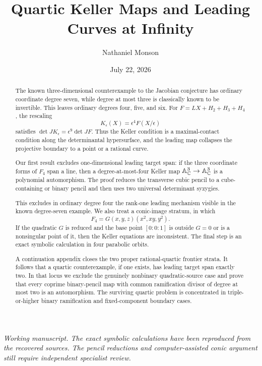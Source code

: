 \documentclass[11pt,reqno]{amsart}
\title[Quartic Keller maps and leading curves]{Quartic Keller Maps and
Leading Curves at Infinity}
\author{Nathaniel Monson}
\date{July 22, 2026}
\begin{document}
\begin{abstract}
The known three-dimensional counterexample to the Jacobian conjecture has
ordinary coordinate degree seven, while degree at most three is classically
known to be invertible.  This leaves ordinary degrees four, five, and six.
For \(F=LX+H_2+H_3+H_4\), the rescaling
\[
K_\epsilon(X)=\epsilon^4F(X/\epsilon)
\]
satisfies \(\det JK_\epsilon=\epsilon^9\det JF\).  Thus the Keller
condition is a maximal-contact condition along the determinantal
hypersurface, and the leading map collapses the projective boundary to a
point or a rational curve.

Our first result excludes one-dimensional leading target span: if the three
coordinate forms of \(F_4\) span a line, then a degree-at-most-four Keller map
\(\mathbb A^3_{\mathbb C}\to\mathbb A^3_{\mathbb C}\) is a polynomial automorphism.  The proof reduces
the transverse cubic pencil to a cube-containing or binary pencil and then
uses two universal determinant syzygies.

This excludes in ordinary degree four the rank-one leading mechanism visible
in the known degree-seven example.  We also treat a conic-image stratum, in
which
\[
F_4=G(x,y,z)(x^2,xy,y^2).
\]
If the quadratic \(G\) is reduced and the base point
\([0:0:1]\) is outside \(G=0\) or is a nonsingular point of it, then the
Keller equations are inconsistent.  The final step is an exact symbolic
calculation in four parabolic orbits.

A continuation appendix closes the two proper rational-quartic frontier
strata.  It follows that a quartic counterexample, if one exists, has leading
target span exactly two.  In that locus we exclude the genuinely nonbinary
quadratic-source case and prove that every coprime binary-pencil map with
common ramification divisor of degree at most two is an automorphism.  The
surviving quartic problem is concentrated in triple-or-higher binary
ramification and fixed-component boundary cases.
\end{abstract}

\maketitle

\begin{center}
\small\emph{Working manuscript.  The exact symbolic calculations have been
reproduced from the recovered sources.  The pencil reductions and
computer-assisted conic argument still require independent specialist
review.}
\end{center}
\end{document}
